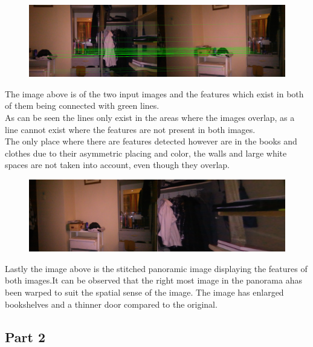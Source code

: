 \documentclass{article}
\begin{document}
\begin{figure}[H]
	\centering
	\includegraphics[width=14cm]{1v.png}
	
\end{figure}
The image above is of the two input images and the features which exist in both of them being connected with green lines.\\
As can be seen the lines only exist in the areas where the images overlap, as a line cannot exist where the features are not present in both images.\\
The only place where there are features detected however are in the books and clothes due to their asymmetric placing and color, the walls and large white spaces are not taken into account, even though they overlap. 
\begin{figure}[H]
	\centering
	\includegraphics[width=14cm]{res2.png}
	
\end{figure}

Lastly the image above is the stitched panoramic image displaying  the features of both images.It can be observed that the right most image in the panorama ahas been warped to suit the spatial sense of the image. The image has enlarged bookshelves and a thinner door compared to the original.

\subsection{Part 2}\label{sec:overview}
\end{document}
